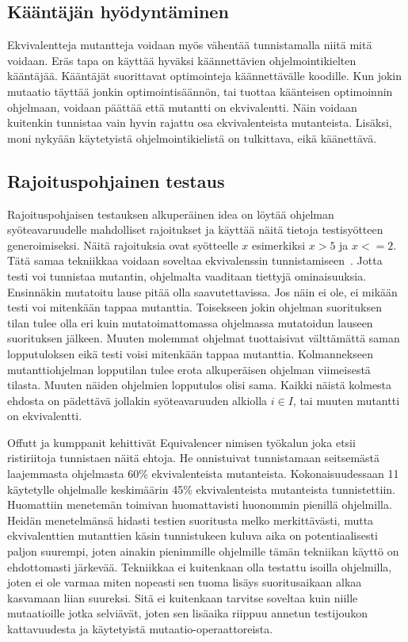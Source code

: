 \documentclass{tktltiki}
\begin{document}
\subsection{Kääntäjän hyödyntäminen}
Ekvivalentteja mutantteja voidaan myös vähentää tunnistamalla niitä mitä voidaan. Eräs tapa on käyttää hyväksi käännettävien ohjelmointikielten kääntäjää. Kääntäjät suorittavat optimointeja käännettävälle koodille. Kun jokin mutaatio täyttää jonkin optimointisäännön, tai tuottaa käänteisen optimoinnin ohjelmaan, voidaan päättää että mutantti on ekvivalentti. Näin voidaan kuitenkin tunnistaa vain hyvin rajattu osa ekvivalenteista mutanteista. Lisäksi, moni nykyään käytetyistä ohjelmointikielistä on tulkittava, eikä käänettävä.

\subsection{Rajoituspohjainen testaus}
Rajoituspohjaisen testauksen alkuperäinen idea on löytää ohjelman syöteavaruudelle mahdolliset rajoitukset ja käyttää näitä tietoja testisyötteen generoimiseksi. Näitä rajoituksia ovat syötteelle $x$ esimerkiksi $x > 5$ ja $x <= 2$. Tätä samaa tekniikkaa voidaan soveltaa ekvivalenssin tunnistamiseen~\cite{OffuttP96}. Jotta testi voi tunnistaa mutantin, ohjelmalta vaaditaan tiettyjä ominaisuuksia. Ensinnäkin mutatoitu lause pitää olla saavutettavissa. Jos näin ei ole, ei mikään testi voi mitenkään tappaa mutanttia. Toisekseen jokin ohjelman suorituksen tilan tulee olla eri kuin mutatoimattomassa ohjelmassa mutatoidun lauseen suorituksen jälkeen. Muuten molemmat ohjelmat tuottaisivat välttämättä saman lopputuloksen eikä testi voisi mitenkään tappaa mutanttia. Kolmannekseen mutanttiohjelman lopputilan tulee erota alkuperäisen ohjelman viimeisestä tilasta. Muuten näiden ohjelmien lopputulos olisi sama. Kaikki näistä kolmesta ehdosta on pädettävä jollakin syöteavaruuden alkiolla $i \in I$, tai muuten mutantti on ekvivalentti. 

Offutt ja kumppanit kehittivät Equivalencer nimisen työkalun joka etsii ristiriitoja tunnistaen näitä ehtoja. He onnistuivat tunnistamaan seitsemästä laajemmasta ohjelmasta 60\% ekvivalenteista mutanteista. Kokonaisuudessaan 11 käytetylle ohjelmalle keskimäärin 45\% ekvivalenteista mutanteista tunnistettiin. Huomattiin menetemän toimivan huomattavisti huonommin pienillä ohjelmilla. Heidän menetelmänsä hidasti testien suoritusta melko merkittävästi, mutta ekvivalenttien mutanttien käsin tunnistukeen kuluva aika on potentiaalisesti paljon suurempi, joten ainakin pienimmille ohjelmille tämän tekniikan käyttö on ehdottomasti järkevää. Tekniikkaa ei kuitenkaan olla testattu isoilla ohjelmilla, joten ei ole varmaa miten nopeasti sen tuoma lisäys suoritusaikaan alkaa kasvamaan liian suureksi. Sitä ei kuitenkaan tarvitse soveltaa kuin niille mutaatioille jotka selviävät, joten sen lisäaika riippuu annetun testijoukon kattavuudesta ja käytetyistä mutaatio-operaattoreista.
\end{document}

